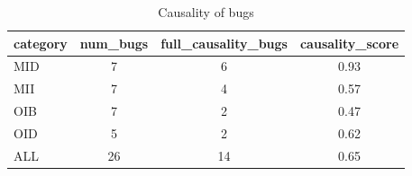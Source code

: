 \begin{table}[ht]
\centering
\renewcommand{\arraystretch}{1.06}
\setlength{\tabcolsep}{4pt}
\begin{tabular}{|l||c|c|c|}
\hline
{\sc category} & {\sc num\_bugs} & {\sc full\_causality\_bugs} & {\sc causality\_score} \\
\toprule
\hline
MID & 7 & 6 & 0.93 \\
\hline
MII & 7 & 4 & 0.57 \\
\hline
OIB & 7 & 2 & 0.47 \\
\hline
OID & 5 & 2 & 0.62 \\
\hline
ALL & 26 & 14 & 0.65 \\
\hline
\end{tabular}
\caption{Causality of bugs}
\end{table}

